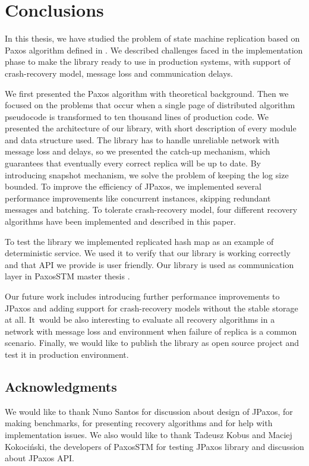 \chapter{Conclusions}

In this thesis, we have studied the problem of state machine replication based
on Paxos algorithm defined in \cite{Lam98}. We described challenges faced in
the implementation phase to make the library ready to use in production systems,
with support of crash-recovery model, message loss and communication delays.

We first presented the Paxos algorithm with theoretical background. Then we
focused on the problems that occur when a single page of distributed algorithm pseudocode 
is transformed to ten thousand lines of production code. We presented
the architecture of our library, with short description of every module and data
structure used. The library has to handle unreliable network with message
loss and delays, so we presented the catch-up mechanism, which guarantees that
eventually every correct replica will be up to date. By introducing snapshot
mechanism, we solve the problem of keeping the log size bounded. To improve the efficiency of JPaxos, we implemented several performance improvements like concurrent
instances, skipping redundant messages and batching. To tolerate crash-recovery
model, four different recovery algorithms have been implemented and described in
this paper.

To test the library we implemented replicated hash map as an example of
deterministic service. We used it to verify that our library is working
correctly and that API we provide is user friendly. Our library is used as 
communication layer in PaxosSTM master thesis \cite{Tad10}.

Our future work includes introducing further performance improvements to JPaxos and
adding support for crash-recovery models without the stable storage at all. It~would be also interesting to evaluate all recovery algorithms in a network with
message loss and environment when failure of replica is a common scenario.
Finally, we would like to publish the library as open source project and test it
in production environment.

\section*{Acknowledgments}

\noindent We would like to thank Nuno Santos for discussion about design of JPaxos, for making benchmarks, for presenting recovery algorithms and for help with implementation issues. We also would like to thank Tadeusz Kobus and Maciej Kokociński, the developers of PaxosSTM for testing JPaxos library and discussion about JPaxos API.

\cleardoublepage
